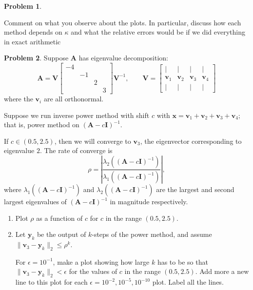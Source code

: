 \documentclass[12pt]{article}
\theoremstyle{definition}
\newtheorem{problem}{Problem}
\renewcommand{\vec}{\mathbf}
\begin{document}
\begin{problem}
\begin{enumerate}
    Comment on what you observe about the plots. 
    In particular, discuss how each method depends on $\kappa$ and what the relative errors would be if we did everything in exact arithmetic

\end{enumerate}
\end{problem}


\begin{problem}
Suppose $\vec{A}$ has eigenvalue decomposition:
\[
    \vec{A} 
    = 
    \vec{V}
    \begin{bmatrix}
        -4 \\ & -1 \\ && 2 \\ &&& 3
    \end{bmatrix}
    \vec{V}^{-1}
    ,\qquad
    \vec{V} = \begin{bmatrix} |&|&|&| \\ \vec{v}_1 & \vec{v}_2 & \vec{v}_3 & \vec{v}_4 \\ |&|&|&| \end{bmatrix}
    \]
where the $\vec{v}_i$ are all orthonormal.

    Suppose we run inverse power method with shift $c$ with $\vec{x} = \vec{v}_1 + \vec{v}_2 + \vec{v}_3 + \vec{v}_4$; that is, power method on $(\vec{A} - c\vec{I})^{-1}$.

    If $c\in(0.5,2.5)$, then we will converge to $\vec{v}_3$, the eigenvector corresponding to eigenvalue $2$.
    The rate of converge is
    \[
        \rho = \left| \frac{\lambda_2((\vec{A}-c\vec{I})^{-1})}{\lambda_1((\vec{A}-c\vec{I})^{-1})} \right|,
    \]
    where $\lambda_1((\vec{A}-c\vec{I})^{-1})$ and $\lambda_2((\vec{A}-c\vec{I})^{-1})$ are the largest and second largest eigenvalues of $(\vec{A} - c\vec{I})^{-1}$ in magnitude respectively.


    \begin{enumerate}
        \item Plot $\rho$ as a function of $c$ for $c$ in the range $(0.5, 2.5)$.

        \item Let $\vec{y}_k$ be the output of $k$-steps of the power method, and assume $\|\vec{v}_3 - \vec{y}_k\|_2 \leq \rho^k$.
            
            For $\epsilon = 10^{-1}$, make a plot showing how large $k$ has to be so that $\|\vec{v}_3 - \vec{y}_k\|_2 < \epsilon$ for the values of $c$ in the range $(0.5,2.5)$.
            Add more a new line to this plot for each $\epsilon = 10^{-2}, 10^{-5}, 10^{-10}$ plot. Label all the lines.

            
\end{enumerate}
\end{problem}
 
\end{document}
